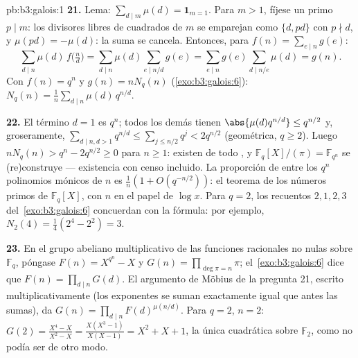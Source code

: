 \begin{solution}{pb:b3:galois:1}
\textbf{21.} Lema: $\sum_{d \mid m}\mu(d) = \mathbf
1_{m=1}$. Para $m > 1$, fíjese un primo $p \mid m$: los divisores libres
de cuadrados de $m$ se emparejan como $\{d, pd\}$ con $p \nmid d$, y
$\mu(pd) = -\mu(d)$: la suma se cancela. Entonces, para $f(n) =
\sum_{e\mid n}g(e)$:
\[
\sum_{d \mid n}\mu(d)\,f\bigl(\tfrac nd\bigr)
= \sum_{d \mid n}\mu(d)\!\!\sum_{e \mid n/d}\!\!g(e)
= \sum_{e \mid n}g(e)\!\!\sum_{d \mid n/e}\!\!\mu(d)
= g(n) .
\]
Con $f(n) = q^n$ y $g(n) = nN_q(n)$
(\cref{exo:b3:galois:6}): $N_q(n) =
\frac1n\sum_{d\mid n}\mu(d)\,q^{n/d}$.

\textbf{22.} El término $d = 1$ es $q^n$; todos los demás tienen
$\abs{\mu(d)q^{n/d}} \leq q^{n/2}$ y, groseramente,
$\sum_{d \mid n, d > 1}q^{n/d} \leq \sum_{j \leq
n/2}q^j < 2q^{n/2}$ (geométrica, $q \geq 2$). Luego $nN_q(n) >
q^n - 2q^{n/2} \geq 0$ para $n \geq 1$: existen
 de todo
, y
$\mathbb F_q[X]/(\pi) = \mathbb F_{q^n}$ se (re)construye --- existencia
con censo incluido. La proporción de
 entre los $q^n$
polinomios mónicos de  $n$ es $\frac1n(1 + O(q^{-n/2}))$: el
teorema de los números primos de $\mathbb F_q[X]$, con $n$ en el papel
de $\log x$. Para $q = 2$, los recuentos $2, 1, 2, 3$
del~\cref{exo:b3:galois:6} concuerdan con la fórmula: por ejemplo,
$N_2(4) = \frac14(2^4 - 2^2) = 3$.

\textbf{23.} En el grupo abeliano multiplicativo de las funciones
racionales no nulas sobre $\mathbb F_q$, póngase $F(n) = X^{q^n} -
X$ y $G(n) = \prod_{\deg\pi = n}\pi$; el~\cref{exo:b3:galois:6} dice que
$F(n) = \prod_{d\mid n}G(d)$. El argumento de Möbius de la pregunta 21,
escrito multiplicativamente (los exponentes se suman exactamente igual
que antes las sumas), da $G(n) = \prod_{d \mid n}F(d)^{\mu(n/d)}$. Para
$q = 2$, $n = 2$: $G(2) = \frac{X^4 - X}{X^2 - X} = \frac{X(X^3 -
1)}{X(X - 1)} = X^2 + X + 1$, la única cuadrática
 sobre $\mathbb F_2$,
como no podía ser de otro modo.


\end{solution}
